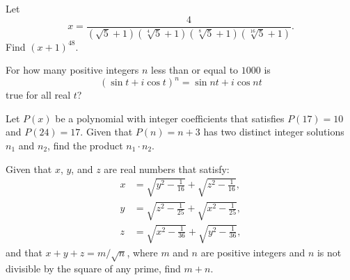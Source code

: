 \documentclass[11pt]{article}
\theoremstyle{definition}
\begin{document}
%	









\begin{question}[name={2005 AIME II, \href{https://artofproblemsolving.com/community/c4p368275}{Problem 7}}]
	Let\[x=\frac{4}{(\sqrt{5}+1)(\sqrt[4]{5}+1)(\sqrt[8]{5}+1)(\sqrt[16]{5}+1)}.\]Find $(x+1)^{48}$.
\end{question}


%	










\begin{question}[name={2005 AIME II, \href{https://artofproblemsolving.com/community/c4p368277}{Problem 9}}]
	For how many positive integers $n$ less than or equal to $1000$ is\[(\sin t + i \cos t)^n=\sin nt + i \cos nt\]true for all real $t$?
\end{question}


%	









\begin{question}[name={2005 AIME II, \href{https://artofproblemsolving.com/community/c4p368300}{Problem 13}}]
	Let $P(x)$ be a polynomial with integer coefficients that satisfies $P(17)=10$ and $P(24)=17$. Given that $P(n)=n+3$ has two distinct integer solutions $n_1$ and $n_2$, find the product $n_1\cdot n_2$.
\end{question}


%	







\begin{question}[name={2006 AIME II, \href{https://artofproblemsolving.com/community/c4p464691}{Problem 15}}]
	Given that $x$, $y$, and $z$ are real numbers that satisfy:
	\begin{align*}
		x &= \sqrt{y^2-\frac{1}{16}}+\sqrt{z^2-\frac{1}{16}},\\
		y &= \sqrt{z^2-\frac{1}{25}}+\sqrt{x^2-\frac{1}{25}},\\
		z &= \sqrt{x^2-\frac{1}{36}}+\sqrt{y^2-\frac{1}{36}},
	\end{align*}
	and that $x+y+z={m}/{\sqrt{n}}$, where $m$ and $n$ are positive integers and $n$ is not divisible by the square of any prime, find $m+n$.
\end{question}
\end{document}
